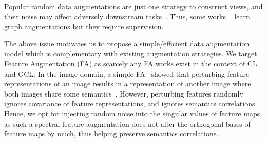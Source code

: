 %
%
Popular random data augmentations are just one strategy to construct views, and their noise may affect adversely downstream tasks~\citep{DBLP:journals/corr/AdversaGA,DBLP:conf/nips/whatGoodVeiw}. Thus, some works ~\citep{DBLP:journals/corr/autogcl, DBLP:conf/nips/whatGoodVeiw,DBLP:journals/corr/AdversaGA} learn graph augmentations but they require supervision.


The above issue motivates us to propose a simple/efficient data augmentation model %
which is complementary with existing augmentation strategies. %
We target Feature Augmentation (FA) as scarcely any FA works  exist in %
the context of CL and GCL.
%
In the image domain, a simple FA~\citep{DBLP:conf/cvpr/UpchurchGPPSBW17,DBLP:conf/icml/BengioMDR13} showed that perturbing feature representations of an image results in a representation of another image where both images share some semantics~\citep{wang2019implicit}. 
%
However, perturbing features randomly ignores covariance of feature representations, and ignores semantics correlations. %
Hence, we opt for injecting  random noise into the singular values of feature maps as such a spectral feature augmentation does not alter the orthogonal bases of feature maps by much, thus helping preserve semantics correlations. 


